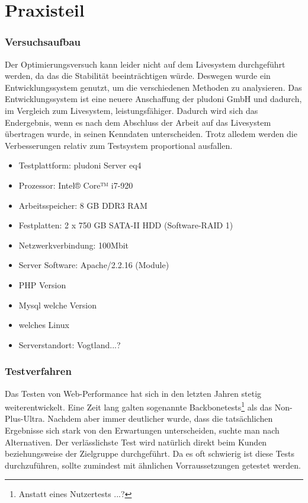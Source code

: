 \part{Praxisteil}

\section{Versuchsaufbau}
Der Optimierungsversuch kann leider nicht auf dem Livesystem durchgeführt werden, da das die Stabilität beeinträchtigen würde. Deswegen wurde ein Entwicklungssystem genutzt, um die verschiedenen Methoden zu analysieren. Das Entwicklungssystem ist eine neuere Anschaffung der pludoni GmbH und dadurch, im Vergleich zum Livesystem, leistungsfähiger. Dadurch wird sich das Endergebnis, wenn es nach dem Abschluss der Arbeit auf das Livesystem übertragen wurde, in seinen Kenndaten unterscheiden. Trotz alledem werden die Verbesserungen relativ zum Testsystem proportional ausfallen. 

\begin{itemize}
 \item Testplattform: pludoni Server eq4
  \item Prozessor: Intel® Core™ i7-920 
  \item Arbeitsspeicher: 8 GB DDR3 RAM
  \item Festplatten: 2 x 750 GB SATA-II HDD (Software-RAID 1)
  \item Netzwerkverbindung: 100Mbit
  \item Server Software: Apache/2.2.16 (Module)
  \item PHP Version
  \item Mysql welche Version
  \item welches Linux 
  \item Serverstandort: Vogtland...?
\end{itemize}

\section{Testverfahren}
Das Testen von Web-Performance hat sich in den letzten Jahren stetig weiterentwickelt. Eine Zeit lang galten sogenannte Backbonetests\footnote{Anstatt eines Nutzertests ...?} als das Non-Plus-Ultra. Nachdem aber immer deutlicher wurde, dass die tatsächlichen Ergebnisse sich stark von den Erwartungen unterscheiden, suchte man nach Alternativen. Der verlässlichste Test wird natürlich direkt beim Kunden beziehungsweise der Zielgruppe durchgeführt. Da es oft schwierig ist diese Tests durchzuführen, sollte zumindest mit ähnlichen Vorraussetzungen getestet werden.
